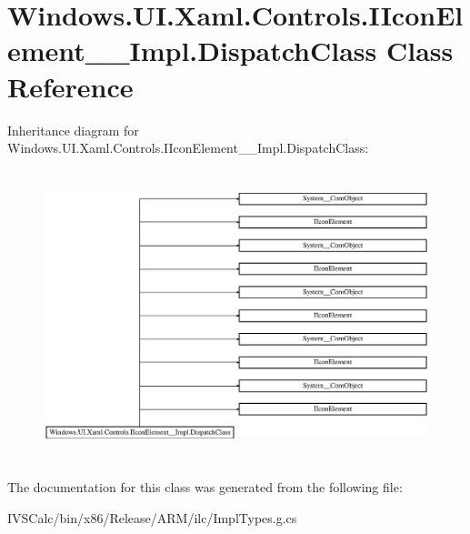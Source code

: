 \hypertarget{class_windows_1_1_u_i_1_1_xaml_1_1_controls_1_1_i_icon_element_____impl_1_1_dispatch_class}{}\section{Windows.\+U\+I.\+Xaml.\+Controls.\+I\+Icon\+Element\+\_\+\+\_\+\+Impl.\+Dispatch\+Class Class Reference}
\label{class_windows_1_1_u_i_1_1_xaml_1_1_controls_1_1_i_icon_element_____impl_1_1_dispatch_class}
Inheritance diagram for Windows.\+U\+I.\+Xaml.\+Controls.\+I\+Icon\+Element\+\_\+\+\_\+\+Impl.\+Dispatch\+Class\+:\begin{figure}[H]
\begin{center}
\leavevmode
\includegraphics[height=8.484849cm]{class_windows_1_1_u_i_1_1_xaml_1_1_controls_1_1_i_icon_element_____impl_1_1_dispatch_class}
\end{center}
\end{figure}


The documentation for this class was generated from the following file\+:\begin{DoxyCompactItemize}
\item 
I\+V\+S\+Calc/bin/x86/\+Release/\+A\+R\+M/ilc/Impl\+Types.\+g.\+cs\end{DoxyCompactItemize}
